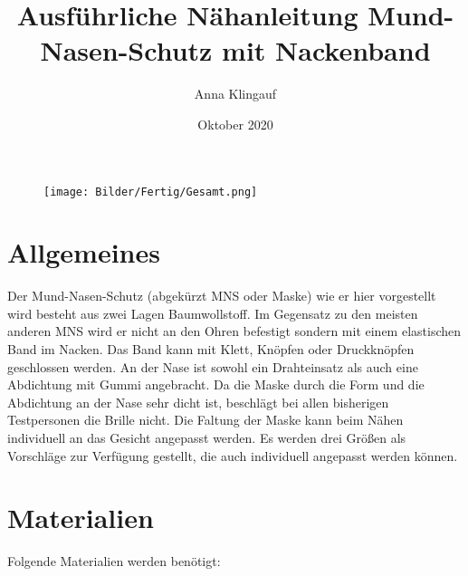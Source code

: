 \documentclass[12pt,parskip=full]{scrartcl}
\title{Ausführliche Nähanleitung Mund-Nasen-Schutz mit Nackenband}
\author{Anna Klingauf}
\date{Oktober 2020}
\begin{document}
\begin{titlepage}
\maketitle
\thispagestyle{empty}
\begin{figure}[b!] 
  \centering
     \texttt{[image: Bilder/Fertig/Gesamt.png]}
\end{figure}
\end{titlepage}
\clearpage

\section{Allgemeines}
Der Mund-Nasen-Schutz (abgekürzt MNS oder Maske) wie er hier vorgestellt wird besteht aus zwei Lagen Baumwollstoff. Im Gegensatz zu den meisten anderen MNS wird er nicht an den Ohren befestigt sondern mit einem elastischen Band im Nacken. Das Band kann mit Klett, Knöpfen oder Druckknöpfen geschlossen werden. An der Nase ist sowohl ein Drahteinsatz als auch eine Abdichtung mit Gummi angebracht. Da die Maske durch die Form und die Abdichtung an der Nase sehr dicht ist, beschlägt bei allen bisherigen Testpersonen die Brille nicht. Die Faltung der Maske kann beim Nähen individuell an das Gesicht angepasst werden. Es werden drei Größen als Vorschläge zur Verfügung gestellt, die auch individuell angepasst werden können.

\section{Materialien}
Folgende Materialien werden benötigt:
\end{document}
